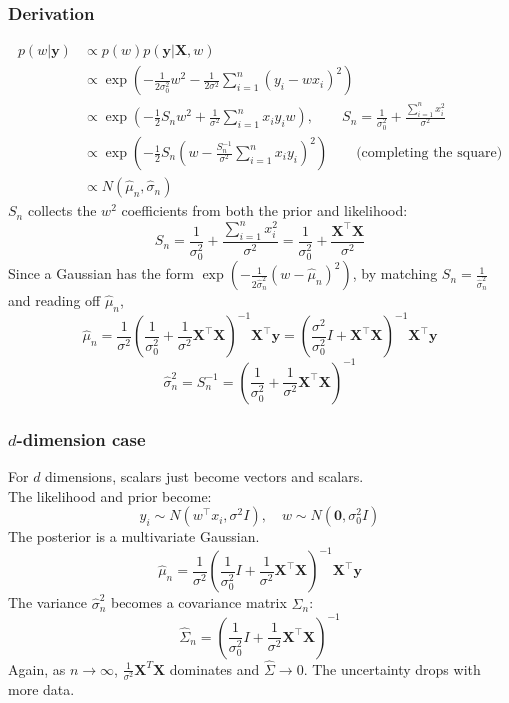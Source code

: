 \documentclass[../Probability.tex]{subfiles}
\begin{document}
\subsubsection{Derivation}
\begin{align*}
p(w|\mathbf{y}) &\propto p(w)p(\mathbf{y}|\mathbf{X}, w) \\
&\propto \exp\left(-\frac{1}{2\sigma_0^2}w^2 - \frac{1}{2\sigma^2}\sum_{i=1}^n(y_i - wx_i)^2\right) \\
&\propto \exp\left(-\frac{1}{2}S_n w^2 + \frac{1}{\sigma^2}\sum_{i=1}^n x_i y_i w\right), 
\qquad S_n = \frac{1}{\sigma_0^2} + \frac{\sum_{i=1}^n x_i^2}{\sigma^2} \\
&\propto \exp\left(-\frac{1}{2}S_n\left(w - \frac{S_n^{-1}}{\sigma^2}\sum_{i=1}^n x_i y_i\right)^2\right) 
\qquad \text{(completing the square)} \\
&\propto N(\hat{\mu}_n, \hat{\sigma}_n)
\end{align*}
$S_n$ collects the $w^2$ coefficients from both the prior and likelihood:
$$S_n = \frac{1}{\sigma_0^2} + \frac{\sum_{i=1}^n x_i^2}{\sigma^2} = \frac{1}{\sigma_0^2} + \frac{\mathbf{X}^\top\mathbf{X}}{\sigma^2}$$
Since a Gaussian has the form $\exp (-\frac{1}{2\hat{\sigma}_n^2}(w - \hat{\mu}_n)^2)$, by matching $S_n = \frac{1}{\hat{\sigma}_n^2}$ and reading off $\hat{\mu}_n$,
$$\hat{\mu}_n = \frac{1}{\sigma^2}\left(\frac{1}{\sigma_0^2} + \frac{1}{\sigma^2}\mathbf{X}^\top\mathbf{X}\right)^{-1}\mathbf{X}^\top\mathbf{y} = \left(\frac{\sigma^2}{\sigma_0^2}I + \mathbf{X}^\top\mathbf{X}\right)^{-1}\mathbf{X}^\top\mathbf{y}$$
$$\hat{\sigma}_n^2 = S_n^{-1} = \left(\frac{1}{\sigma_0^2} + \frac{1}{\sigma^2}\mathbf{X}^\top\mathbf{X}\right)^{-1}$$

\subsubsection{$d$-dimension case}
For $d$ dimensions, scalars just become vectors and scalars.\\
The likelihood and prior become:
$$y_i \sim N(w^\top x_i, \sigma^2 I), \quad w \sim N(\mathbf{0}, \sigma_0^2 I)$$
The posterior is a multivariate Gaussian.
$$\hat{\mu}_n = \frac{1}{\sigma^2}\left(\frac{1}{\sigma_0^2}I + \frac{1}{\sigma^2}\mathbf{X}^\top\mathbf{X}\right)^{-1}\mathbf{X}^\top\mathbf{y}$$
The variance $\hat{\sigma}_n^2$ becomes a covariance matrix $\hat{\Sigma}_n$:
$$\hat{\Sigma}_n = \left(\frac{1}{\sigma_0^2}I + \frac{1}{\sigma^2}\mathbf{X}^\top\mathbf{X}\right)^{-1}$$
Again, as $n \to \infty$, $\frac{1}{\sigma^2}\mathbf{X}^T \mathbf{X}$ dominates and $\hat{\Sigma} \to 0$. The uncertainty drops with more data.
\end{document}
